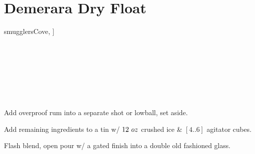 \section[Demerara Dry Float]{Demerara Dry Float~}


\begin{recipestats}[
	servings=1,
	preptime=5~\minute,
	original=\citeauthor{beachbumBerryIntoxica}~\cite{beachbumBerryIntoxica},
	source=\citeauthor{smugglersCove}~\cite[p.~44]{smugglersCove},
]
\end{recipestats}


\begin{recipeabstract}
\end{recipeabstract}


\begin{ingredientcolumns}[1]
	\begin{ingredientblock}
		\\
		\\
		\\
		\\
		\\
		\\
	\end{ingredientblock}
\end{ingredientcolumns}


\begin{preparation}
	\item Add overproof rum into a separate shot or lowball, set aside.
	\item Add remaining ingredients to a tin w/ $12~oz$ crushed ice \& $[4..6]$ agitator cubes.
	\item Flash blend, open pour w/ a gated finish into a double old fashioned glass.
\end{preparation}


\recipeend%
